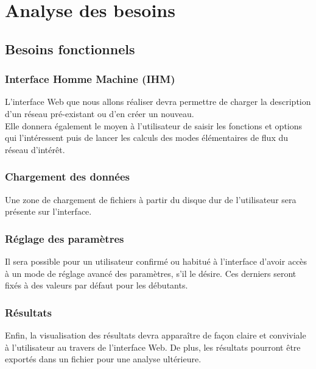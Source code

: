 \section{Analyse des besoins}

\subsection{Besoins fonctionnels}

\subsubsection{Interface Homme Machine (IHM)}
L'interface Web que nous allons réaliser devra permettre de charger la description d'un réseau pré-existant ou d'en créer un nouveau.\\
Elle donnera également le moyen à l'utilisateur de saisir les fonctions et options qui l'intéressent puis de lancer les calculs des modes élémentaires de flux du réseau d'intérêt. 

\subsubsection{Chargement des données}
Une zone de chargement de fichiers à partir du disque dur de l'utilisateur sera présente sur l'interface. \\

\subsubsection{Réglage des paramètres}
Il sera possible pour un utilisateur confirmé ou habitué à l'interface d'avoir accès à un mode de réglage avancé des paramètres, s'il le désire. Ces derniers seront fixés à des valeurs par défaut pour les débutants. 

\subsubsection{Résultats}
Enfin, la visualisation des résultats devra apparaître de façon claire et conviviale à l'utilisateur au travers de l'interface Web. De plus, les résultats pourront être exportés dans un fichier pour une analyse ultérieure. %

